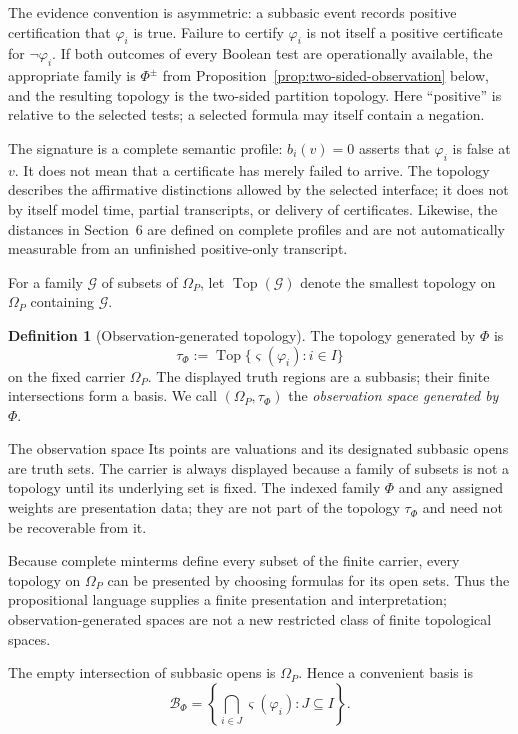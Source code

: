 \documentclass[11pt]{article}
\theoremstyle{definition}
\newtheorem{definition}{Definition}[section]
\theoremstyle{plain}
\theoremstyle{remark}
\newcommand{\Top}{\operatorname{Top}}
\begin{document}
The evidence convention is asymmetric: a subbasic event records positive
certification that $\varphi_i$ is true.  Failure to certify $\varphi_i$ is not
itself a positive certificate for $\neg\varphi_i$.  If both outcomes of every
Boolean test are operationally available, the appropriate family is
$\Phi^{\pm}$ from Proposition~\ref{prop:two-sided-observation} below, and the
resulting topology is the two-sided partition topology.  Here ``positive'' is
relative to the selected tests; a selected formula may itself contain a
negation.

The signature is a complete semantic profile: $b_i(v)=0$ asserts that
$\varphi_i$ is false at $v$.  It does not mean that a certificate has merely
failed to arrive.  The topology describes the affirmative distinctions allowed
by the selected interface; it does not by itself model time, partial transcripts,
or delivery of certificates.  Likewise, the distances in Section~6 are defined
on complete profiles and are not automatically measurable from an unfinished
positive-only transcript.

For a family $\mathcal G$ of subsets of $\Omega_P$, let
$\Top(\mathcal G)$ denote the smallest topology on $\Omega_P$ containing
$\mathcal G$.

\begin{definition}[Observation-generated topology]
The topology generated by $\Phi$ is
\[
  \tau_\Phi:=\Top\{\varsigma(\varphi_i):i\in I\}
\]
on the fixed carrier $\Omega_P$.  The displayed truth regions are a subbasis;
their finite intersections form a basis.  We call $(\Omega_P,\tau_\Phi)$ the
\emph{observation space generated by $\Phi$}.
\end{definition}

The observation space  Its points are valuations and its designated subbasic opens are truth
sets.  The carrier is always displayed because a family of subsets is not a
topology until its underlying set is fixed.  The indexed family $\Phi$ and any
assigned weights are presentation data; they are not part of the topology
$\tau_\Phi$ and need not be recoverable from it.

Because complete minterms define every subset of the finite carrier, every
topology on $\Omega_P$ can be presented by choosing formulas for its open sets.
Thus the propositional language supplies a finite presentation and
interpretation; observation-generated spaces are not a new restricted class of
finite topological spaces.

The empty intersection of subbasic opens is $\Omega_P$.  Hence a convenient
basis is
\[
  \mathcal B_\Phi
  =\left\{
    \bigcap_{i\in J}\varsigma(\varphi_i):J\subseteq I
   \right\}.
\]
\end{document}
